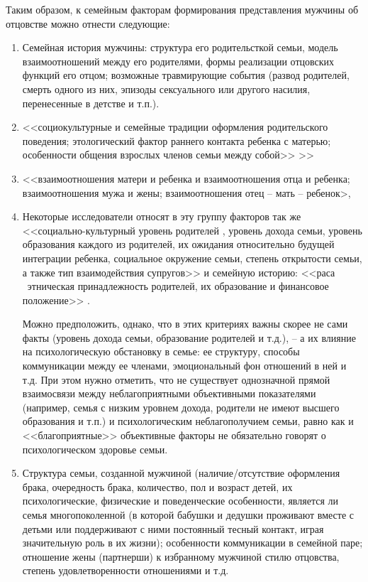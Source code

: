 \documentclass{../../common/thesisbyxetex}
\begin{document}
Таким образом, к семейным факторам формирования представления мужчины об отцовстве можно отнести
следующие:
\begin{enumerate}
	\item Семейная история мужчины: структура его родительсткой семьи,  модель взаимоотношений
между его родителями, формы реализации отцовских функций его отцом; возможные травмирующие события
(развод родителей, смерть одного из них, эпизоды сексуального или другого насилия, перенесенные в
детстве и т.п.).

\item <<социокультурные и семейные традиции оформления
родительского
поведения;
этологический фактор раннего контакта ребенка с матерью; особенности общения взрослых членов семьи
между собой>> \cite[16]{varga}>>

\item <<взаимоотношения матери и ребенка
и взаимоотношения отца и ребенка; взаимоотношения мужа и жены; взаимоотношения отец –
мать – ребенок>, \cite[40]{otage}

\item Некоторые исследователи относят  в эту группу факторов так же <<социально-культурный уровень
родителей , уровень дохода семьи, уровень
образования каждого из родителей, их ожидания относительно будущей интеграции
ребенка, социальное окружение семьи, степень открытости семьи, а также тип
взаимодействия супругов>> \cite[286]{strat} и семейную историю: <<раса \ этническая принадлежность
родителей, их образование и финансовое положение>> \cite[164]{long}.

Можно предположить, однако, что в этих критериях важны скорее не сами факты (уровень дохода семьи,
образование родителей и т.д.), -- а их влияние на психологическую обстановку в семье: ее структуру,
способы коммуникации между ее членами, эмоциональный фон отношений в ней и т.д. При этом нужно
отметить, что не существует однозначной прямой взаимосвязи между неблагоприятными объективными
показателями (например, семья с низким уровнем дохода, родители не имеют высшего образования и
т.п.) и психологическим неблагополучием семьи, равно как и <<благоприятные>> объективные факторы не
 обязательно говорят о психологическом здоровье семьи.

 \item Структура семьи, созданной мужчиной (наличие/отсутствие оформления брака,
очередность брака, количество, пол и возраст детей, их психологические, физические и
поведенческие особенности, является ли семья многопоколенной (в которой бабушки и дедушки
проживают вместе с детьми или поддерживают с ними постоянный тесный контакт, играя
значительную роль в их жизни); особенности коммуникации в семейной паре; отношение жены  (партнерши)
к избранному мужчиной стилю отцовства, степень удовлетворенности отношениями и т.д.


\end{enumerate}
\end{document}
